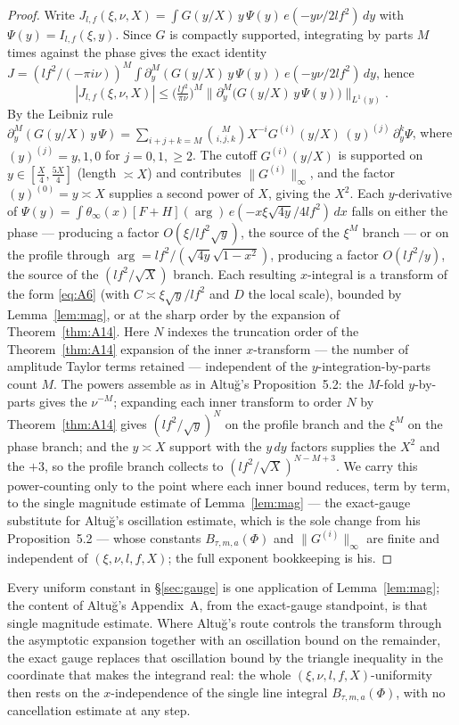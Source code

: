 \documentclass[11pt]{article}
\theoremstyle{definition}
\begin{document}
\begin{proof}
Write $J_{l,f}(\xi,\nu,X)=\int G(y/X)\,y\,\Psi(y)\,e(-y\nu/2lf^2)\,dy$ with $\Psi(y)=I_{l,f}(\xi,y)$.
Since $G$ is compactly supported, integrating by parts $M$ times against the phase gives the exact
identity $J=(lf^2/(-\pi i\nu))^M\int\partial_y^M(G(y/X)\,y\,\Psi(y))\,e(-y\nu/2lf^2)\,dy$, hence
\[
  |J_{l,f}(\xi,\nu,X)|\le\Big(\tfrac{lf^2}{\pi\nu}\Big)^{M}
    \big\|\partial_y^M\!\big(G(y/X)\,y\,\Psi(y)\big)\big\|_{L^1(y)} .
\]
By the Leibniz rule
$\partial_y^M(G(y/X)\,y\,\Psi)=\sum_{i+j+k=M}\binom{M}{i,j,k}X^{-i}G^{(i)}(y/X)\,(y)^{(j)}\,
\partial_y^k\Psi$, where $(y)^{(j)}=y,1,0$ for $j=0,1,\ge2$. The cutoff $G^{(i)}(y/X)$ is supported on
$y\in[\tfrac X4,\tfrac{5X}4]$ (length $\asymp X$) and contributes $\|G^{(i)}\|_\infty$, and the factor
$(y)^{(0)}=y\asymp X$ supplies a second power of $X$, giving the $X^2$. Each $y$-derivative of
$\Psi(y)=\int\theta_\infty(x)[F+H](\arg)\,e(-x\xi\sqrt{4y}/4lf^2)\,dx$ falls on either the phase ---
producing a factor $O(\xi/lf^2\sqrt y)$, the source of the $\xi^M$ branch --- or on the profile through
$\arg=lf^2/(\sqrt{4y}\sqrt{1-x^2})$, producing a factor $O(lf^2/y)$, the source of the $(lf^2/\sqrt
X)$ branch. Each resulting $x$-integral is a transform of the form \eqref{eq:A6} (with $C\asymp\xi\sqrt
y/lf^2$ and $D$ the local scale), bounded by Lemma~\ref{lem:mag}, or at the sharp order by the
expansion of Theorem~\ref{thm:A14}. Here $N$ indexes the truncation order of the Theorem~\ref{thm:A14} expansion of the inner $x$-transform --- the
number of amplitude Taylor terms retained --- independent of the $y$-integration-by-parts count $M$. The powers
assemble as in Altu\u{g}'s Proposition~5.2: the $M$-fold $y$-by-parts gives the $\nu^{-M}$; expanding each inner
transform to order $N$ by Theorem~\ref{thm:A14} gives $(lf^2/\sqrt y)^{N}$ on the profile branch and the $\xi^M$
on the phase branch; and the $y\asymp X$ support with the $y\,dy$ factors supplies the $X^2$ and the $+3$, so the
profile branch collects to $(lf^2/\sqrt X)^{N-M+3}$. We carry this power-counting only to the point where each
inner bound reduces, term by term, to the single magnitude estimate of Lemma~\ref{lem:mag} --- the exact-gauge
substitute for Altu\u{g}'s oscillation estimate, which is the sole change from his Proposition~5.2 --- whose
constants $B_{\tau,m,a}(\Phi)$ and $\|G^{(i)}\|_\infty$ are finite and independent of $(\xi,\nu,l,f,X)$; the full
exponent bookkeeping is his.
\end{proof}

Every uniform constant in \S\ref{sec:gauge} is one application of Lemma~\ref{lem:mag}; the content of
Altu\u{g}'s Appendix~A, from the exact-gauge standpoint, is that single magnitude estimate. Where
Altu\u{g}'s route controls the transform through the asymptotic expansion together with an oscillation
bound on the remainder, the exact gauge replaces that oscillation bound by the triangle inequality in
the coordinate that makes the integrand real: the whole $(\xi,\nu,l,f,X)$-uniformity then rests on the
$x$-independence of the single line integral $B_{\tau,m,a}(\Phi)$, with no cancellation estimate at any
step.
\end{document}
